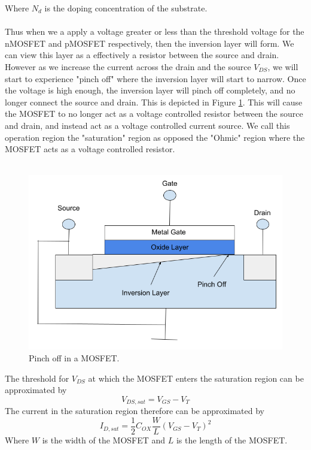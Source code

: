 \documentclass[
  reprint,
  amsmath,amssymb,
  aps
]{revtex4-1}
\begin{document}
Where $N_d$ is the doping concentration of the substrate.\\\\
Thus when we a apply a voltage greater or less than the threshold voltage for the nMOSFET and pMOSFET respectively, then the inversion layer will form. We 
can view this layer as a effectively a resistor between the source and drain. However as we increase the current across the 
drain and the source $V_{DS}$, we will start to experience "pinch off" where the inversion layer will start to narrow. Once the 
voltage is high enough, the inversion layer will pinch off completely, and no longer connect the source and drain. This is 
depicted in Figure \ref{fig:mosfet pinch off}. This will cause the MOSFET to no longer act as a voltage controlled 
resistor between the source and drain, and instead act as a voltage controlled current source. We call this 
operation region the "saturation" region as opposed the "Ohmic" region where the MOSFET acts as a voltage controlled resistor.\\\\
\begin{figure}
    \centering
    \includegraphics[width=0.9\linewidth]{mosfet_pinch_off.png}
    \caption{Pinch off in a MOSFET.}
    \label{fig:mosfet pinch off}
\end{figure}
The threshold for $V_{DS}$ at which the MOSFET enters the saturation region can be approximated by \cite{ChenmingHu6}
\begin{equation}
    V_{DS,sat} = V_{GS} - V_{T}
\end{equation}
The current in the saturation region therefore can be approximated by\cite{ChenmingHu6}
\begin{equation}
    I_{D,sat} = \frac{1}{2}C_{OX}\frac{W}{L}(V_{GS}-V_{T})^{2}
    \label{eq:mosfet saturation current}
\end{equation}
Where $W$ is the width of the MOSFET and $L$ is the length of the MOSFET.
\end{document}
